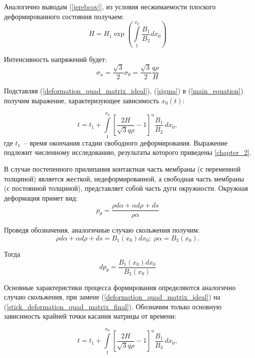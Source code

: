  Аналогично выводам [\ref{jerebcov}], из условия несжимаемости плоского деформированного состояния получаем:
 \begin{equation}
 H=H_1\exp\left(\int\limits_1^{x_0}\dfrac{B_1}{B_2}dx_0\right)
  \label{quad_matrix_h}
 \end{equation}
 
 Интенсивность напряжений будет:
 \begin{equation}
 \sigma_u = \dfrac{\sqrt 3}{2}\sigma_\theta = \dfrac{\sqrt 3}{2}\dfrac{q\rho}{H}
 \label{sigma}
 \end{equation}
 
 Подставляя (\ref{deformation_quad_matrix_ideal}), (\ref{sigma}) в (\ref{main_equation}) получим выражение, характеризующее зависимость $x_0(t)$:
 
 \begin{equation}
   t = t_1 + \int\limits^{x_0}_1 \left[ \dfrac{2H}{\sqrt3 q \rho} -1\right]^n\dfrac{B_1}{B_2}\,dx_0,
   \end{equation}
где $t_1$~-- время окончания стадии свободного деформирования.   
Выражение подлежит численному исследованию, результаты которого приведены \ref{chapter_2}.

В случае постепенного прилипания контактная часть мембраны (с переменной толщиной)
является жесткой, недеформированной, а свободная часть мембраны (с постоянной толщиной), представляет собой часть дуги окружности.
Окружная деформация примет вид:
\begin{equation}
p_\theta = \dfrac{\rho d\alpha +\alpha d\rho+ds}{\rho\alpha}
\label{stick_deformation_quad_matrix}
\end{equation}

Проведя обозначения, аналогичные случаю скольжения получим: 
\begin{equation}
\rho d\alpha + \alpha d\rho +ds = B_1(x_0)dx_0;\; \rho\alpha = B_3(x_0).
\end{equation}

Тогда 
\begin{equation}
	dp_\theta = \dfrac{B_1(x_0)dx_0}{B_3(x_0)}
\label{stick_deformation_quad_matrix_final}
\end{equation}

Основные характеристики процесса формирования определяются аналогично случаю скольжения, при замене (\ref{deformation_quad_matrix_ideal}) 
на (\ref{stick_deformation_quad_matrix_final}). Обозначим только основную зависимость крайней точки касания матрицы от времени:

 \begin{equation}
   t = t_1 + \int\limits^{x_0}_1 \left[ \dfrac{2H}{\sqrt3 q \rho} -1\right]^n\dfrac{B_1}{B_3}\,dx_0,
   \end{equation}
